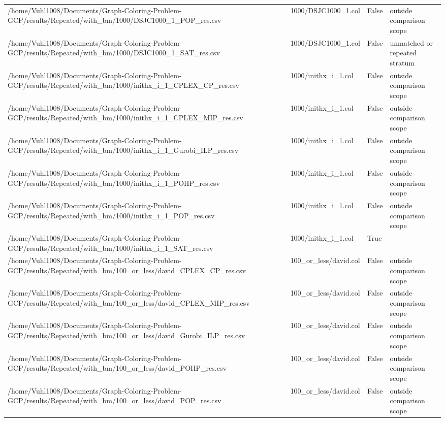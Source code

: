 \begin{table}[htbp]
\begin{tabular}{llll}
/home/Vuhl1008/Documents/Graph-Coloring-Problem-GCP/results/Repeated/with\_bm/1000/DSJC1000\_1\_POP\_res.csv & 1000/DSJC1000\_1.col & False & outside comparison scope \\
/home/Vuhl1008/Documents/Graph-Coloring-Problem-GCP/results/Repeated/with\_bm/1000/DSJC1000\_1\_SAT\_res.csv & 1000/DSJC1000\_1.col & False & unmatched or repeated stratum \\
/home/Vuhl1008/Documents/Graph-Coloring-Problem-GCP/results/Repeated/with\_bm/1000/inithx\_i\_1\_CPLEX\_CP\_res.csv & 1000/inithx\_i\_1.col & False & outside comparison scope \\
/home/Vuhl1008/Documents/Graph-Coloring-Problem-GCP/results/Repeated/with\_bm/1000/inithx\_i\_1\_CPLEX\_MIP\_res.csv & 1000/inithx\_i\_1.col & False & outside comparison scope \\
/home/Vuhl1008/Documents/Graph-Coloring-Problem-GCP/results/Repeated/with\_bm/1000/inithx\_i\_1\_Gurobi\_ILP\_res.csv & 1000/inithx\_i\_1.col & False & outside comparison scope \\
/home/Vuhl1008/Documents/Graph-Coloring-Problem-GCP/results/Repeated/with\_bm/1000/inithx\_i\_1\_POHP\_res.csv & 1000/inithx\_i\_1.col & False & outside comparison scope \\
/home/Vuhl1008/Documents/Graph-Coloring-Problem-GCP/results/Repeated/with\_bm/1000/inithx\_i\_1\_POP\_res.csv & 1000/inithx\_i\_1.col & False & outside comparison scope \\
/home/Vuhl1008/Documents/Graph-Coloring-Problem-GCP/results/Repeated/with\_bm/1000/inithx\_i\_1\_SAT\_res.csv & 1000/inithx\_i\_1.col & True & -- \\
/home/Vuhl1008/Documents/Graph-Coloring-Problem-GCP/results/Repeated/with\_bm/100\_or\_less/david\_CPLEX\_CP\_res.csv & 100\_or\_less/david.col & False & outside comparison scope \\
/home/Vuhl1008/Documents/Graph-Coloring-Problem-GCP/results/Repeated/with\_bm/100\_or\_less/david\_CPLEX\_MIP\_res.csv & 100\_or\_less/david.col & False & outside comparison scope \\
/home/Vuhl1008/Documents/Graph-Coloring-Problem-GCP/results/Repeated/with\_bm/100\_or\_less/david\_Gurobi\_ILP\_res.csv & 100\_or\_less/david.col & False & outside comparison scope \\
/home/Vuhl1008/Documents/Graph-Coloring-Problem-GCP/results/Repeated/with\_bm/100\_or\_less/david\_POHP\_res.csv & 100\_or\_less/david.col & False & outside comparison scope \\
/home/Vuhl1008/Documents/Graph-Coloring-Problem-GCP/results/Repeated/with\_bm/100\_or\_less/david\_POP\_res.csv & 100\_or\_less/david.col & False & outside comparison scope \\

\end{tabular}
\end{table}
